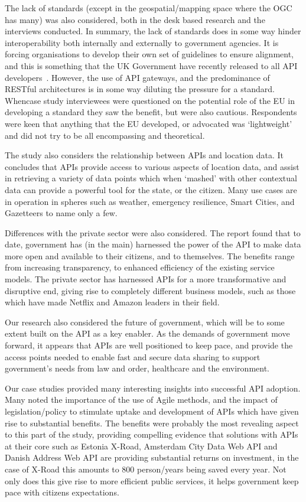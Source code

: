 The lack of standards (except in the geospatial/mapping space where the OGC has many)
was also considered, both in the desk based research and the interviews conducted.
In summary, the lack of standards does in some way hinder interoperability both
internally and externally to government agencies. It is forcing organisations to develop their own set of guidelines to ensure alignment, and this is something that the UK
Government have recently released to all API developers~\citep{gov_uk_api}. However, the use
of API gateways, and the predominance of RESTful architectures is in some way diluting
the pressure for a standard. Whencase study interviewees were questioned on the potential role of the EU in developing a standard they saw the benefit, but were also cautious. Respondents were keen that anything that the EU developed, or advocated was ‘lightweight’
and did not try to be all encompassing and theoretical.

The study also considers the relationship between APIs and location data. It concludes
that APIs provide access to various aspects of location data, and assist in retrieving
a variety of data points which when ‘mashed’ with other contextual data can provide a powerful tool for the state, or the citizen. Many use cases are in operation in spheres
such as weather, emergency resilience, Smart Cities, and Gazetteers to name only a few.

Differences with the private sector were also considered. The report found that to date, government has (in the main) harnessed the power of the API to make data more open and available to their citizens, and to themselves. The benefits range from increasing transparency, to enhanced efficiency of the existing service models. The private sector
has harnessed APIs for a more transformative and disruptive end, giving rise to
completely different business models, such as those which have made Netflix and Amazon leaders in their field.

Our research also considered the future of government, which will be to some extent
built on the API as a key enabler. As the demands of government move forward, it
appears that APIs are well positioned to keep pace, and provide the access points
needed to enable fast and secure data sharing to support government’s needs from
law and order, healthcare and the environment.

Our case studies provided many interesting insights into successful API adoption.
Many noted the importance of the use of Agile methods, and the impact of
legislation/policy to stimulate uptake and development of APIs which have given rise
to substantial benefits. The benefits were probably the most revealing aspect to this
part of the study, providing compelling evidence that solutions with APIs at their
core such as Estonia X-Road, Amsterdam City Data Web API and Danish Address Web API
are providing substantial returns on investment, in the case of X-Road this amounts
to 800 person/years being saved every year. Not only does this give rise to more
efficient public services, it helps government keep pace with citizens expectations.

